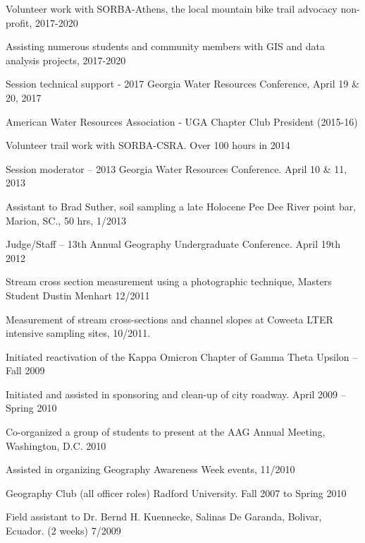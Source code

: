 \documentclass[10pt,letterpaper]{article}
\begin{document}
	\begin{itemize*}

	\item
	Volunteer work with SORBA-Athens, the local mountain bike trail advocacy non-profit, 2017-2020
	\item
	Assisting numerous students and community members with GIS and data analysis projects, 2017-2020
	\item
	Session technical support - 2017 Georgia Water Resources Conference, April 19 \& 20, 2017
	\item
	American Water Resources Association - UGA Chapter Club President (2015-16)
	\item
	Volunteer trail work with SORBA-CSRA. Over 100 hours in 2014
	\item
	Session moderator – 2013 Georgia Water Resources Conference. April 10 \& 11, 2013
	\item
	Assistant to Brad Suther, soil sampling a late Holocene Pee Dee River point bar, Marion, SC., 50 hrs, 1/2013
	\item
	Judge/Staff – 13th Annual Geography Undergraduate Conference. April 19th 2012
	\item
	Stream cross section measurement using a photographic technique, Masters Student Dustin Menhart 12/2011
	\item 
	Measurement of stream cross-sections and channel slopes at Coweeta LTER intensive sampling sites, 10/2011.
	\item 
	Initiated reactivation of the Kappa Omicron Chapter of Gamma Theta Upsilon – Fall 2009
	\item 
	Initiated and assisted in sponsoring and clean-up of city roadway. April 2009 – Spring 2010
	\item 
	Co-organized a group of students to present at the AAG Annual Meeting, Washington, D.C. 2010
	\item 
	Assisted in organizing Geography Awareness Week events, 11/2010
	\item 
	Geography Club (all officer roles) Radford University. Fall 2007 to Spring 2010
	\item 
	Field assistant to Dr. Bernd H. Kuennecke, Salinas De Garanda, Bolivar, Ecuador. (2 weeks) 7/2009


\end{itemize*}

\endgroup
\end{document}

